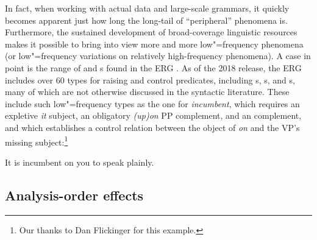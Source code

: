 \documentclass[output=paper
                ,modfonts
                ,nonflat
	        ,collection
	        ,collectionchapter
	        ,collectiontoclongg
 	        ,biblatex
                ,babelshorthands
                ,newtxmath
                ,draftmode
                ,colorlinks, citecolor=brown
]{./langsci/langscibook}
\begin{document}
In fact, when working with actual data and large-scale grammars,
it quickly becomes apparent just how long the long-tail of ``peripheral'' phenomena is. Furthermore, the sustained development of broad-coverage linguistic resources makes it possible
to bring into view more and more low"=frequency phenomena
(or low"=frequency variations on relatively high-frequency phenomena).
A case in point is the range of  and  s
found in the ERG \citep{Flickinger2000a,Flickinger2011a-u}.
As of the 2018 release, the ERG includes over 60 types for raising and control predicates,
including s, s, and s,
many of which are not otherwise discussed in the syntactic literature.
These include such low"=frequency types as the one for \textit{incumbent},
which requires an expletive \textit{it} subject,
an obligatory \textit{(up)on} PP complement,
and an  complement,
and which establishes a control relation between
the object of \textit{on} and the VP's missing subject:\footnote{%
	Our thanks to Dan Flickinger for this example.
}

\begin{exe}
\ex\label{cl:incumbent} 
It is incumbent on you to speak plainly.
\end{exe}%
%



\subsection{Analysis-order effects}
\end{document}
